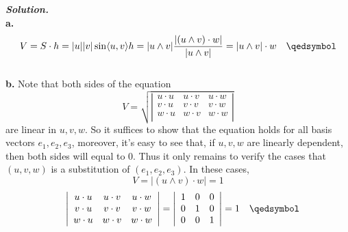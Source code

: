 \documentclass{article}
\begin{document}
\par
\textbf{\textit{Solution.}}\\
\textbf{a. }
$$
    V = S \cdot h = |u||v|\sin \langle u,v \rangle h = |u \wedge v|\frac{|(u \wedge v) \cdot w|}{|u \wedge v|} = |u \wedge v| \cdot w 
    \quad \qedsymbol
$$\\
\textbf{b. }Note that both sides of the equation
$$
    V = 
    \sqrt{\left|\begin{array}{ccc} 
        u \cdot u & u \cdot v & u \cdot w \\ 
        v \cdot u & v \cdot v & v \cdot w \\ 
        w \cdot u & w \cdot v & w \cdot w \\ 
    \end{array}\right|}
$$
are linear in $u,v,w$. So it suffices to show that the equation holds for all basis vectors $e_1, e_2, e_3$, moreover, it's easy to see that,
if $u, v, w$ are linearly dependent, then both sides will equal to 0. Thus it only remains to verify the cases that $(u, v, w)$ is a 
substitution of $(e_1, e_2, e_3)$. In these cases,
$$
    V = |(u \wedge v) \cdot w| = 1
$$
$$
    \quad
    \left|\begin{array}{ccc} 
    u \cdot u & u \cdot v & u \cdot w \\ 
    v \cdot u & v \cdot v & v \cdot w \\ 
    w \cdot u & w \cdot v & w \cdot w \\ 
    \end{array}\right|
    =
    \left|\begin{array}{ccc} 
    1 & 0 & 0 \\ 
    0 & 1 & 0 \\ 
    0 & 0 & 1 \\ 
    \end{array}\right|
    = 1 \quad \qedsymbol
$$
\end{document}

